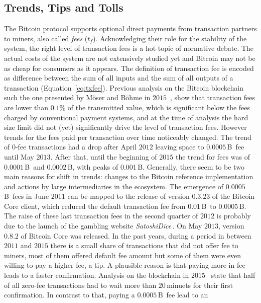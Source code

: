 \documentclass[USenglish]{uit-thesis}
\def\bitcoin{\leavevmode\rlap{\hskip.5pt-}B}
\begin{document}
\subsection{Trends, Tips and Tolls}
The Bitcoin protocol supports optional direct payments
from transaction partners to miners,
also called \emph{fees} ($t_f$). Acknowledging their
role for the stability of the system, the right level of
transaction fees is a hot topic of normative debate.
The actual costs of the system are
not extensively studied yet and
Bitcoin may not be as cheap for
consumers as it appears.
The definition of transaction fee is encoded
as difference between the sum of all inputs
and the sum of all outputs
of a transaction (Equation~\ref{eq:txfee}).
Previous analysis on the Bitcoin blockchain
such the one presented by
Möser and Böhme in $2015$~\cite{Moser2015},
show that transaction fees are lower than $0.1\%$ of
the transmitted value, which
is significant below the fees charged
by conventional payment systems, and at the time
of analysis the hard size limit
did not (yet) significantly drive
the level of transaction fees. However
trends for the fees paid per transaction
over time noticeably changed. The trend
of $0$-fee transactions had a drop
after April $2012$ leaving space to
$0.0005$\,\bitcoin~fee until May $2013$.
After that, until the beginning of $2015$
the trend for fees was of $0.0001$\,\bitcoin~and
$0.0002$\,\bitcoin, with peaks of
$0.001$\,\bitcoin. Generally,
there seem to be two main
reasons for shift in trends:
changes to the Bitcoin reference implementation
and actions by large intermediaries in the ecosystem.
The emergence of $0.0005$\,\bitcoin~fees
in June $2011$ can be mapped to the release of version $0.3.23$
of the Bitcoin Core client, which reduced the default transaction fee
from $0.01$\,\bitcoin~to $0.0005$\,\bitcoin. The raise of these
last transaction fees in the second quarter of $2012$ is probably
due to the launch of the gambling website \emph{SatoshiDice}\,\cite{satoshidice}.
On May $2013$, version $0.8.2$ of Bitcoin Core was released.
In the past years, during a period in between
$2011$ and $2015$ there is a small share of
transactions that did not offer fee to miners,
most of them offered default fee amount but some of them
were even willing to pay a higher fee, a tip. A plausible reason
is that paying more in fee leads to a faster confirmation.
Analysis on the blockchain in $2015$~\cite{Moser2015}
state that half of all zero-fee transactions
had to wait more than $20$\,minuets for their first confirmation.
In contrast to that, paying a $0.0005$\,\bitcoin~fee lead to an
\end{document}
